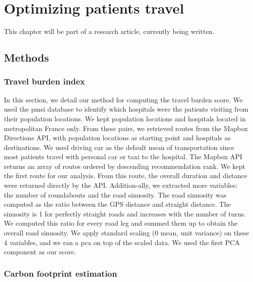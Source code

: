 \chapter{Optimizing patients travel}

This chapter will be part of a research article, currently being
written.

\section{Methods}

\subsection{Travel burden index}

In this section, we detail our method for computing the travel burden score. We
used the \ac{pmsi} database to identify which hospitals were the patients
visiting from their population locations. We kept population locations and
hospitals located in metropolitan France only. From these pairs, we retrieved
routes from the Mapbox Directions API, with population locations as starting
point and hospitals as destinations.  We used driving car as the default mean of
transportation since most patients travel with personal car or taxi to the
hospital. The Mapbox API returns an array of routes ordered by descending
recommendation rank. We kept the first route for our analysis. From this route,
the overall duration and distance were returned directly by the API.
Addition-ally, we extracted more variables: the number of roundabouts and the
road sinuosity. The road sinuosity was computed as the ratio between the GPS
distance and straight distance. The sinuosity is 1 for perfectly straight roads
and increases with the number of turns. We computed this ratio for every road
leg and summed them up to obtain the overall road sinuosity. We apply standard
scaling (0 mean, unit variance) on these 4 variables, and we ran a \ac{pca} on
top of the scaled data. We used the first PCA component as our score.

\subsection{Carbon footprint estimation}

